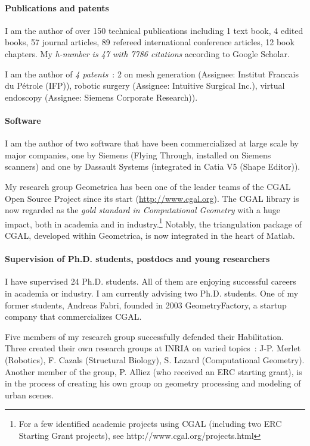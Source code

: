 \paragraph{Publications and patents} \mbox{}

I am the author of over 150 technical publications including 1 text book, 4 edited books, 57 journal articles, 89 refereed international conference articles, 12 book chapters. My {\em h-number is 47 with 7786 citations} according to Google Scholar. 

I am the author of {\em 4 patents}~: 2 on mesh generation (Assignee: Institut Francais du P\'etrole (IFP)), robotic surgery (Assignee: Intuitive Surgical Inc.), virtual endoscopy (Assignee: Siemens Corporate Research)).

\paragraph{Software} \mbox{}

I am the author of two software that have been commercialized at large scale by major companies, one by Siemens (Flying Through, installed on Siemens scanners) and one by Dassault Systems (integrated in Catia V5 (Shape Editor)). 

My research group Geometrica has been one of the leader teams of  the CGAL Open Source Project since its start (\url{http://www.cgal.org}{}).  The CGAL library  is now regarded as the {\em gold standard in Computational Geometry} with a huge impact, both in academia and in industry.\footnote{For a few identified academic projects using CGAL (including two ERC Starting Grant projects), see
http://www.cgal.org/projects.html} Notably, the triangulation package of CGAL, developed within Geometrica, is now integrated in the heart of Matlab.

\paragraph{Supervision of Ph.D. students, postdocs and young researchers} \mbox{}

I have supervised 24 Ph.D. students. All of them are enjoying successful careers in academia or industry. I am currently advising two Ph.D. students. One of my former students, Andreas Fabri, founded in 2003 GeometryFactory, a startup company that commercializes CGAL.

Five members of my research group successfully defended their Habilitation.  Three created their own research groups at INRIA on varied topics~: J-P. Merlet (Robotics), F. Cazals (Structural Biology), S. Lazard (Computational Geometry). Another member of the group, P. Alliez (who received an ERC starting grant), is in the process of creating his own group on geometry processing and modeling of urban scenes.

